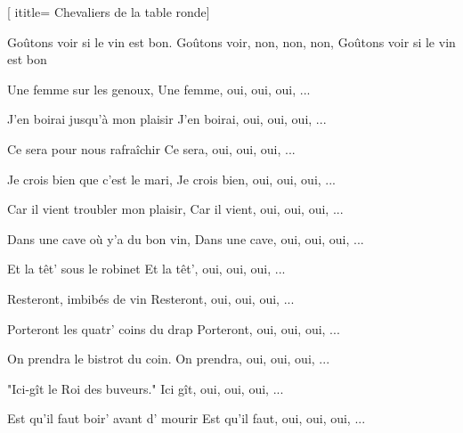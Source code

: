 [
ititle= {Chevaliers de la table ronde}]

\beginverse
{} {Goûtons voir si le vin est bon.}
 {Goûtons voir, non, non, non,} {Goûtons voir si le vin est bon}
\endverse

\beginverse
{} {Une femme sur les genoux,}
Une femme, oui, oui, oui, ...
\endverse

\beginverse
{} {J'en boirai jusqu'à mon plaisir}
J'en boirai, oui, oui, oui, ...
\endverse

\beginverse
{} {Ce sera pour nous rafraîchir}
Ce sera, oui, oui, oui, ...
\endverse

\beginverse
{} {Je crois bien que c'est le mari,}
Je crois bien, oui, oui, oui, ...
\endverse

\beginverse
{} {Car il vient troubler mon plaisir,}
Car il vient, oui, oui, oui, ...
\endverse

\beginverse
{} {Dans une cave où y'a du bon vin,}
Dans une cave, oui, oui, oui, ...
\endverse

\beginverse
{} {Et la têt' sous le robinet}
Et la têt', oui, oui, oui, ...
\endverse

\beginverse
{} {Resteront, imbibés de vin}
Resteront, oui, oui, oui, ...
\endverse

\beginverse
{} {Porteront les quatr' coins du drap}
Porteront, oui, oui, oui, ...
\endverse

\beginverse
{} {On prendra le bistrot du coin.}
On prendra, oui, oui, oui, ...
\endverse

\beginverse
{} {"Ici-gît le Roi des buveurs."}
Ici gît, oui, oui, oui, ...
\endverse

\beginverse
{} {Est qu'il faut boir' avant d' mourir}
Est qu'il faut, oui, oui, oui, ...
\endverse

\endsong